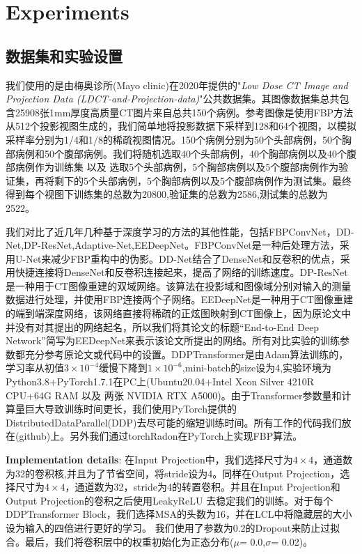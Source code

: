 \section{Experiments}
\subsection{数据集和实验设置}
我们使用的是由梅奥诊所(Mayo clinic)在2020年提供的"\emph{Low Dose CT Image and Projection Data (LDCT-and-Projection-data)}"\cite{moen2021low}公共数据集。其图像数据集总共包含25908张1mm厚度高质量CT图片来自总共150个病例。参考图像是使用FBP方法从512个投影视图生成的，我们简单地将投影数据下采样到128和64个视图，以模拟采样率分别为1/4和1/8的稀疏视图情况。150个病例分别为50个头部病例，50个胸部病例和50个腹部病例。我们将随机选取40个头部病例，40个胸部病例以及40个腹部病例作为训练集 以及 选取5个头部病例，5个胸部病例以及5个腹部病例作为验证集，再将剩下的5个头部病例，5个胸部病例以及5个腹部病例作为测试集。最终得到每个视图下训练集的总数为20800,验证集的总数为2586,测试集的总数为2522。\par
我们对比了近几年几种基于深度学习的方法的其他性能，包括FBPConvNet\cite{2016FBPConvNet}，DD-Net\cite{2018DDNet},DP-ResNet\cite{2019DP-ResNet},Adaptive-Net\cite{2020ADAPTIVE},EEDeepNet\cite{2020An}。FBPConvNet是一种后处理方法，采用U-Net\cite{2015Unet}来减少FBP重构中的伪影。DD-Net结合了DenseNet\cite{2016DenseNet}和反卷积的优点，采用快捷连接将DenseNet和反卷积连接起来，提高了网络的训练速度。DP-ResNet是一种用于CT图像重建的双域网络。该算法在投影域和图像域分别对输入的测量数据进行处理，并使用FBP连接两个子网络。EEDeepNet是一种用于CT图像重建的端到端深度网络，该网络直接将稀疏的正炫图映射到CT图像上，因为原论文中并没有对其提出的网络起名，所以我们将其论文的标题“End-to-End Deep Network”简写为EEDeepNet来表示该论文所提出的网络。所有对比实验的训练参数都充分参考原论文或代码中的设置。DDPTransformer是由Adam算法\cite{2014Adam}训练的，学习率从初值$3\times10^{-4}$缓慢下降到$1 \times 10^{-6}$,mini-batch的size设为4,实验环境为Python3.8+PyTorch1.7.1在PC上(Ubuntu20.04+Intel Xeon Silver 4210R CPU+64G RAM 以及 两张 NVIDIA RTX A5000)。由于Transformer参数量和计算量巨大导致训练时间更长，我们使用PyTorch提供的DistributedDataParallel(DDP)去尽可能的缩短训练时间。所有工作的代码我们放在(github)上。另外我们通过torchRadon\cite{torch_radon}在PyTorch上实现FBP算法。\par

\textbf{Implementation details}: 在Input Projection中，我们选择尺寸为${4}\times{4}$，通道数为32的卷积核,并且为了节省空间，将stride设为4。同样在Output Projection，选择尺寸为${4}\times{4}$，通道数为32，stride为4的转置卷积。并且在Input Projection和Output Projection的卷积之后使用LeakyReLU\cite{2013Rectifier} 去稳定我们的训练。对于每个DDPTransformer Block，我们选择MSA的头数为16，并在LCL中将隐藏层的大小设为输入的四倍进行更好的学习。 我们使用了参数为0.2的Dropout\cite{2014Dropout}来防止过拟合。最后，我们将卷积层中的权重初始化为正态分布($\mu$= 0.0,$\sigma$= 0.02)。\par

